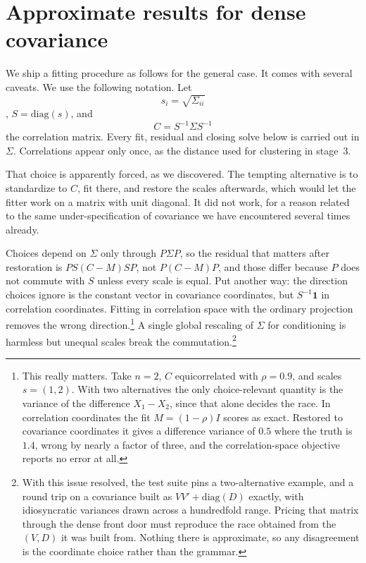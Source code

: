 \documentclass[11pt]{article}
\begin{document}
\section{Approximate results for dense covariance}\label{sec:general}

We ship a fitting procedure as follows for the general case. It comes with several caveats. We use the following notation. Let $$s_i=\sqrt{\Sigma_{ii}}$$,
$S=\mathrm{diag}(s)$, and $$C=S^{-1}\Sigma S^{-1}$$ the correlation
matrix. Every fit, residual and closing solve below is carried out in
$\Sigma$. Correlations appear only once, as the distance used for
clustering in stage~3.

That choice is apparently forced, as we discovered. The tempting
alternative is to standardize to $C$,
fit there, and restore the scales afterwards, which would let the fitter
work on a matrix with unit diagonal. It did not work, for a reason related to the same under-specification of covariance we have encountered several times already.

Choices depend on $\Sigma$ only through $P\Sigma P$, so
the residual that matters after restoration is $PS(C-M)SP$, not
$P(C-M)P$, and those differ because $P$ does not commute with $S$ unless
every scale is equal. Put another way: the direction choices ignore is
the constant vector in covariance coordinates, but $S^{-1}\mathbf{1}$ in
correlation coordinates. Fitting in correlation space with the ordinary
projection removes the wrong direction.\footnote{This really matters. Take $n=2$, $C$ equicorrelated with $\rho=0.9$, and
scales $s=(1,2)$. With two alternatives the only choice-relevant
quantity is the variance of the difference $X_1-X_2$, since that alone
decides the race. In correlation coordinates the fit $M=(1-\rho)I$ scores as exact.
Restored to covariance coordinates it gives a difference variance of
$0.5$ where the truth is $1.4$, wrong by nearly a factor of three, and
the correlation-space objective reports no error at all.} A single global rescaling of $\Sigma$ for conditioning is harmless but
unequal scales break the commutation.\footnote{With this issue resolved, the test suite pins a two-alternative example, and a round trip on a covariance built as
$VV'+\mathrm{diag}(D)$ exactly, with idiosyncratic variances drawn across
a hundredfold range. Pricing that matrix through the dense front door
must reproduce the race obtained from the $(V,D)$ it was built from.
Nothing there is approximate, so any disagreement is the coordinate
choice rather than the grammar.}
\end{document}
